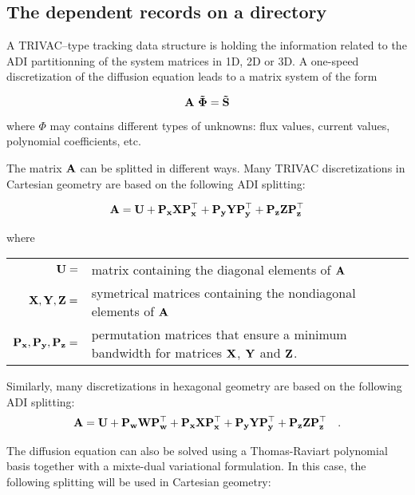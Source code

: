 \subsection{The  dependent records on a
 directory}\label{sect:trivatrackingdir}

A TRIVAC--type tracking data structure is holding the information related to
the ADI partitionning of the system matrices in 1D, 2D or 3D. A one-speed
discretization of the diffusion equation leads to a matrix system of the form

\begin{equation}
\bf{A} \ \vec\Phi = \vec S
\label{eq:tratr1}
\end{equation}

\noindent where $\Phi$ may contains different types of unknowns: flux values,
current values, polynomial coefficients, etc.

\vskip 0.2cm

The matrix $\bf{A}$ can be splitted in different ways. Many TRIVAC discretizations in
Cartesian geometry are based on the following ADI splitting:

\begin{equation}
\bf{A} = \bf{U} + \bf{P}_x\bf{X}\bf{P}_x^\top + \bf{P}_y\bf{Y}\bf{P}_y^\top + \bf{P}_z\bf{Z}\bf{P}_z^\top
\label{eq:tratr2}
\end{equation}

\noindent where

\begin{tabular}{rl}
$\bf{U}=$ & matrix containing the diagonal elements of $\bf{A}$\\
$\bf{X},\bf{Y},\bf{Z}=$ & symetrical matrices containing the nondiagonal elements of $\bf{A}$\\
$\bf{P}_x,\bf{P}_y,\bf{P}_z=$ & permutation matrices that ensure a minimum bandwidth for matrices $\bf{X}$, $\bf{Y}$ and $\bf{Z}$.\\
\end{tabular}

\vskip 0.2cm

Similarly, many discretizations in hexagonal geometry are based on the following ADI splitting:
\begin{equation}
\bf{A} = \bf{U} + \bf{P_w}\bf{W}\bf{P}_w^\top + \bf{P}_x\bf{X}\bf{P}_x^\top + \bf{P}_y\bf{Y}\bf{P}_y^\top + \bf{P}_z\bf{Z}\bf{P}_z^\top \ \ \ .
\label{eq:tratr3}
\end{equation}

The diffusion equation can also be solved using a Thomas-Raviart polynomial basis together with a mixte-dual
variational formulation. In this case, the following splitting will be used in Cartesian geometry:

